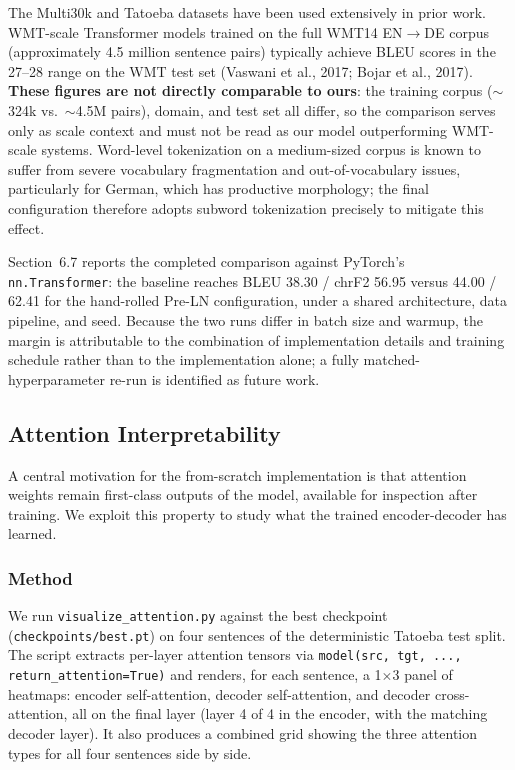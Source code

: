 \documentclass[10pt]{article}
\begin{document}
The Multi30k and Tatoeba datasets have been used extensively in prior work. WMT-scale Transformer models trained on the full WMT14 EN$\rightarrow$DE corpus (approximately 4.5 million sentence pairs) typically achieve BLEU scores in the 27--28 range on the WMT test set (Vaswani et al., 2017; Bojar et al., 2017). \textbf{These figures are not directly comparable to ours}: the training corpus ($\sim$324k vs.\ $\sim$4.5M pairs), domain, and test set all differ, so the comparison serves only as scale context and must not be read as our model outperforming WMT-scale systems. Word-level tokenization on a medium-sized corpus is known to suffer from severe vocabulary fragmentation and out-of-vocabulary issues, particularly for German, which has productive morphology; the final configuration therefore adopts subword tokenization precisely to mitigate this effect.

Section~6.7 reports the completed comparison against PyTorch's \texttt{nn.Transformer}: the baseline reaches BLEU 38.30 / chrF2 56.95 versus 44.00 / 62.41 for the hand-rolled Pre-LN configuration, under a shared architecture, data pipeline, and seed. Because the two runs differ in batch size and warmup, the margin is attributable to the combination of implementation details and training schedule rather than to the implementation alone; a fully matched-hyperparameter re-run is identified as future work.

\subsection{Attention Interpretability}

A central motivation for the from-scratch implementation is that attention weights remain first-class outputs of the model, available for inspection after training. We exploit this property to study what the trained encoder-decoder has learned.

\subsubsection{Method}

We run \texttt{visualize\_attention.py} against the best checkpoint (\texttt{checkpoints/best.pt}) on four sentences of the deterministic Tatoeba test split. The script extracts per-layer attention tensors via \texttt{model(src, tgt, ..., return\_attention=True)} and renders, for each sentence, a 1$\times$3 panel of heatmaps: encoder self-attention, decoder self-attention, and decoder cross-attention, all on the final layer (layer 4 of 4 in the encoder, with the matching decoder layer). It also produces a combined grid showing the three attention types for all four sentences side by side.
\end{document}
